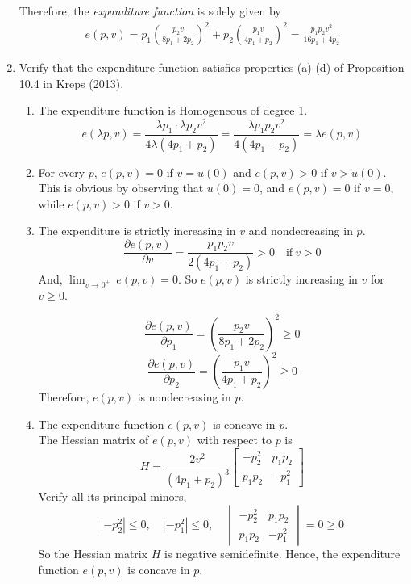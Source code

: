 \documentclass{article}
\begin{document}
\begin{enumerate}
  Therefore, the \emph{expanditure function} is solely given by
  \begin{align*}
    e(p,v) = p_1 \left( \frac{p_2v}{8p_1 + 2p_2} \right)^2 +
              p_2 \left( \frac{p_1v}{4p_1 +  p_2} \right)^2
           = \frac{p_1 p_2 v^2}{16p_1 + 4p_2}
  \end{align*}


  \item Verify that the expenditure function satisfies properties (a)-(d) of
        Proposition 10.4 in Kreps (2013).\\

  \begin{enumerate}
    \item The expenditure function is Homogeneous of degree 1. \\
    \[ e(\lambda p, v) =
        \frac{\lambda p_1\cdot \lambda p_2 v^2}{4\lambda (4p_1 + p_2)} =
        \frac{\lambda p_1 p_2 v^2}{4 (4p_1 + p_2)} =
        \lambda e(p,v)
    \]

    \item For every $p$, $e(p,v)=0$ if $v=u(0)$ and $e(p,v)>0$ if $v>u(0)$.\\

    This is obvious by observing that $u(0)=0$, and $e(p,v)=0$ if $v=0$, while
    $e(p,v)>0$ if $v>0$.\\

    \item The expenditure is strictly increasing in $v$
          and nondecreasing in $p$.\\
    \[ \frac{\partial e(p,v)}{\partial v} =
         \frac{p_1 p_2 v}{2(4p_1 + p_2)}  > 0 \quad
         \textrm{if}\ v > 0
    \]
    And, $\lim_{v \to 0^{+}}\ e(p,v) = 0$. So $e(p,v)$ is strictly increasing
    in $v$ for $v \geq 0$.

    \[  \frac{\partial e(p,v)}{\partial p_1} =
           \left( \frac{p_2v}{8p_1 + 2p_2} \right)^2 \geq 0
    \]
    \[  \frac{\partial e(p,v)}{\partial p_2} =
            \left( \frac{p_1v}{4p_1 +  p_2} \right)^2 \geq 0
    \]
    Therefore, $e(p,v)$ is nondecreasing in $p$. \\

    \item The expenditure function $e(p,v)$ is concave in $p$.\\

    The Hessian matrix of $e(p,v)$ with respect to $p$ is
    \[  H = \frac{2v^2}{(4p_1 + p_2)^3}
          \begin{bmatrix}
            -p_2^2 & p_1p_2 \\
            p_1p_2 & -p_1^2
          \end{bmatrix}
    \]
    Verify all its principal minors,
    \[ |-p_2^2| \leq 0, \quad |-p_1^2| \leq 0,\quad
       \begin{vmatrix}
         -p_2^2 & p_1p_2 \\
         p_1p_2 & -p_1^2
       \end{vmatrix} = 0 \geq 0
    \]
    So the Hessian matrix $H$ is negative semidefinite.
    Hence, the expenditure function $e(p,v)$ is concave in $p$.\\


\end{enumerate}
\end{enumerate}
\end{document}
